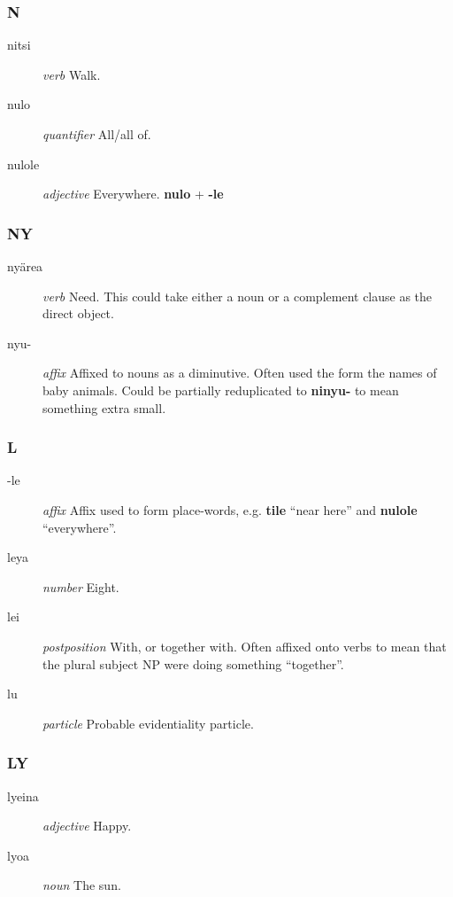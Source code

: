 \documentclass{article}
\begin{document}
\subsubsection{N}

\begin{description}
\item [nitsi] \emph{verb} Walk.
\item [nulo] \emph{quantifier} All/all of.
\item [nulole] \emph{adjective} Everywhere. \textbf{nulo} + \textbf{-le}
\end{description}

\subsubsection{NY}

\begin{description}
\item [ny\"area] \emph{verb} Need.  This could take either a noun or a complement clause as the direct object.
\item [nyu-] \emph{affix} Affixed to nouns as a diminutive.  Often used the form the names of baby animals.  Could be partially reduplicated to \textbf{ninyu-} to mean something extra small.
\end{description}

\subsubsection{L}

\begin{description}
\item [-le] \emph{affix} Affix used to form place-words, e.g. \textbf{tile} ``near here'' and \textbf{nulole} ``everywhere''.
\item [leya] \emph{number} Eight.
\item [lei] \emph{postposition} With, or together with.  Often affixed onto verbs to mean that the plural subject NP were doing something ``together''.
\item [lu] \emph{particle} Probable evidentiality particle.
\end{description}

\subsubsection{LY}

\begin{description}
\item [lyeina] \emph{adjective} Happy.
\item [lyoa] \emph{noun} The sun.
\end{description}
\end{document}
